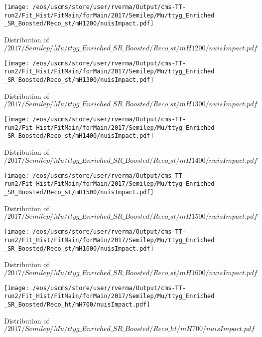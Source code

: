 \begin{figure}
\centering
\texttt{[image: /eos/uscms/store/user/rverma/Output/cms-TT-run2/Fit\_Hist/FitMain/forMain/2017/Semilep/Mu/ttyg\_Enriched\_SR\_Boosted/Reco\_st/mH1200/nuisImpact.pdf]}
\caption{Distribution of $/2017/Semilep/Mu/ttyg\_Enriched\_SR\_Boosted/Reco\_st/mH1200/nuisImpact.pdf$}
\end{figure}

\begin{figure}
\centering
\texttt{[image: /eos/uscms/store/user/rverma/Output/cms-TT-run2/Fit\_Hist/FitMain/forMain/2017/Semilep/Mu/ttyg\_Enriched\_SR\_Boosted/Reco\_st/mH1300/nuisImpact.pdf]}
\caption{Distribution of $/2017/Semilep/Mu/ttyg\_Enriched\_SR\_Boosted/Reco\_st/mH1300/nuisImpact.pdf$}
\end{figure}

\begin{figure}
\centering
\texttt{[image: /eos/uscms/store/user/rverma/Output/cms-TT-run2/Fit\_Hist/FitMain/forMain/2017/Semilep/Mu/ttyg\_Enriched\_SR\_Boosted/Reco\_st/mH1400/nuisImpact.pdf]}
\caption{Distribution of $/2017/Semilep/Mu/ttyg\_Enriched\_SR\_Boosted/Reco\_st/mH1400/nuisImpact.pdf$}
\end{figure}

\begin{figure}
\centering
\texttt{[image: /eos/uscms/store/user/rverma/Output/cms-TT-run2/Fit\_Hist/FitMain/forMain/2017/Semilep/Mu/ttyg\_Enriched\_SR\_Boosted/Reco\_st/mH1500/nuisImpact.pdf]}
\caption{Distribution of $/2017/Semilep/Mu/ttyg\_Enriched\_SR\_Boosted/Reco\_st/mH1500/nuisImpact.pdf$}
\end{figure}

\begin{figure}
\centering
\texttt{[image: /eos/uscms/store/user/rverma/Output/cms-TT-run2/Fit\_Hist/FitMain/forMain/2017/Semilep/Mu/ttyg\_Enriched\_SR\_Boosted/Reco\_st/mH1600/nuisImpact.pdf]}
\caption{Distribution of $/2017/Semilep/Mu/ttyg\_Enriched\_SR\_Boosted/Reco\_st/mH1600/nuisImpact.pdf$}
\end{figure}

\begin{figure}
\centering
\texttt{[image: /eos/uscms/store/user/rverma/Output/cms-TT-run2/Fit\_Hist/FitMain/forMain/2017/Semilep/Mu/ttyg\_Enriched\_SR\_Boosted/Reco\_ht/mH700/nuisImpact.pdf]}
\caption{Distribution of $/2017/Semilep/Mu/ttyg\_Enriched\_SR\_Boosted/Reco\_ht/mH700/nuisImpact.pdf$}
\end{figure}

